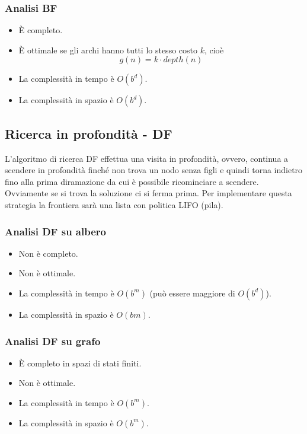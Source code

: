 \subsubsection{Analisi BF}
\begin{itemize}
	\item \`E completo.
	\item \`E ottimale se gli archi hanno tutti lo stesso costo $k$, cio\`e
	      \[ g(n) = k \cdot depth(n) \]
	\item La complessit\`a in tempo \`e $O(b^d)$.
	\item La complessit\`a in spazio \`e $O(b^d)$.
\end{itemize}

\subsection{Ricerca in profondit\`a - DF}
L'algoritmo di ricerca DF effettua una visita in profondit\`a, ovvero, continua a scendere
in profondit\`a finch\'e non trova un nodo senza figli e quindi torna indietro fino alla
prima diramazione da cui \`e possibile ricominciare a scendere. Ovviamente se si trova la
soluzione ci si ferma prima. Per implementare questa strategia la frontiera sar\`a una
lista con politica LIFO (pila).

\subsubsection{Analisi DF su albero}
\begin{itemize}
	\item Non \`e completo.
	\item Non \`e ottimale.
	\item La complessit\`a in tempo \`e $O(b^m)$ (pu\`o essere maggiore di $O(b^d)$).
	\item La complessit\`a in spazio \`e $O(bm)$.
\end{itemize}
\subsubsection{Analisi DF su grafo}
\begin{itemize}
	\item \`E completo in spazi di stati finiti.
	\item Non \`e ottimale.
	\item La complessit\`a in tempo \`e $O(b^m)$.
	\item La complessit\`a in spazio \`e $O(b^m)$.
\end{itemize}

